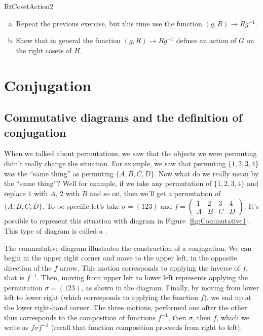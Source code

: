 \begin {exercise}{RtCosetAction2}
\begin{enumerate}[(a)]
\item Repeat the previous exercise, but this time use the function $(g,R)\rightarrow Rg^{-1}$.
\item Show that in general the function $(g,R)\rightarrow Rg^{-1}$ defines an action of $G$ on the right cosets of $H$.  
\end {enumerate}
\end {exercise}
\section{Conjugation}\label {Conjugation}
\subsection{Commutative diagrams and the definition of conjugation}
When we talked about permutations, we saw that the objects we were permuting didn't really change the situation.  For example, we saw that permuting $\{1,2,3,4\}$ was the ``same thing'' as permuting $\{A,B,C,D\}$. Now what do we really mean by the ``same thing''? Well for example, if we take any permutation of $\{1,2,3,4\}$ and replace $1$ with $A$, $2$ with $B$ and so on, then we'll get a permutation of $\{A,B,C,D\}$. To be specific let's take $\sigma=(123)$ and $f=\begin {pmatrix} 1&2&3&4\\A&B&C&D\end {pmatrix}$.  It's possible to represent this situation with diagram in Figure~\ref{fig:Commutative1}. This type of diagram is called a .


The commutative diagram illustrates the construction of a conjugation. We can begin in the upper right corner and move to the upper left, in the opposite direction of the $f$ arrow. This motion corresponds to
applying the inverse of $f$, that is 
 $f^{-1}$.  Then, moving from upper left to lower left represents applying the permutation $\sigma=(123)$, as shown in the diagram.  Finally, by moving from lower left to lower right (which corresponds to 
applying the function $f$), we end up at the lower right-hand corner. The three motions, performed one after the other thus corresponds to the composition of functions $f^{-1}$, then $\sigma$, then $f$, which we write as
$f \sigma f^{-1}$ (recall that function composition proceeds from right to left). 

